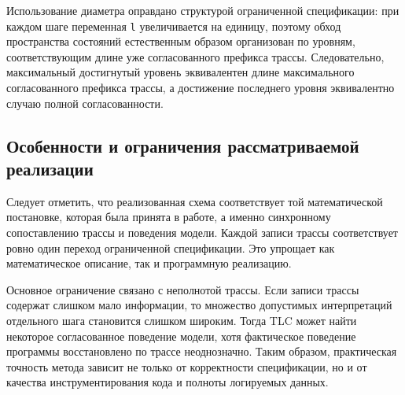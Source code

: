 Использование диаметра оправдано структурой ограниченной спецификации: при
каждом шаге переменная \texttt{l} увеличивается на единицу, поэтому обход
пространства состояний естественным образом организован по уровням,
соответствующим длине уже согласованного префикса трассы. Следовательно,
максимальный достигнутый уровень эквивалентен длине максимального согласованного
префикса трассы, а достижение последнего уровня эквивалентно случаю полной
согласованности.

\subsection{Особенности и ограничения рассматриваемой реализации}

Следует отметить, что реализованная схема соответствует той математической
постановке, которая была принята в работе, а именно синхронному сопоставлению
трассы и поведения модели. Каждой записи трассы соответствует ровно один
переход ограниченной спецификации. Это упрощает как математическое описание,
так и программную реализацию.

Основное ограничение связано с неполнотой трассы. Если записи трассы содержат
слишком мало информации, то множество допустимых интерпретаций отдельного шага
становится слишком широким. Тогда TLC может найти некоторое согласованное
поведение модели, хотя фактическое поведение программы восстановлено по трассе
неоднозначно. Таким образом, практическая точность метода зависит не только от
корректности спецификации, но и от качества инструментирования кода и полноты
логируемых данных.

